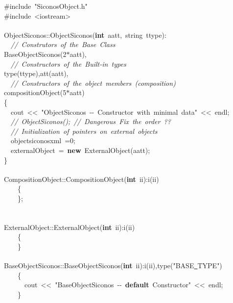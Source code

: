 {\ttfamily \raggedright \small
\#include\ "{}SiconosObject.h"{}\\
\#include\ <{}iostream>{}\\
\ \\
ObjectSiconos::ObjectSiconos(\textbf{int}\ aatt,\ string\ ttype):\\
\ \ \textsl{//\ Construtors\ of\ the\ Base\ Class}\\
BaseObjectSiconos(2$\ast$aatt),\\
\ \ \textsl{//\ Constructors\ of\ the\ Built-{}in\ types}\\
type(ttype),att(aatt),\\
\ \ \textsl{//\ Constructors\ of\ the\ object\ members\ (composition)}\\
compositionObject(5$\ast$aatt)\\
\{\\
\ \ cout\ <{}<{}\ "{}ObjectSiconos\ -{}-{}\ Constructor\ with\ minimal\ data"{}\ <{}<{}\ endl;\\
\ \ \textsl{//\ ObjectSiconos();\ //\ Dangerous\ Fix\ the\ order\ ??}\\
\ \ \textsl{//\ Initialization\ of\ pointers\ on\ external\ objects}\\
\ \ objectsiconosxml\ =0;\\
\ \ externalObject\ =\ \textbf{new}\ ExternalObject(aatt);\\
\}\\
\ \\
CompositionObject::CompositionObject(\textbf{int}\ ii):i(ii)\\
\ \ \ \ \{\\
\ \ \ \ \};\\
\ \\
\ \\
ExternalObject::ExternalObject(\textbf{int}\ ii):i(ii)\\
\ \ \ \ \{\\
\ \ \ \ \}\\
\ \\
BaseObjectSiconos::BaseObjectSiconos(\textbf{int}\ ii):i(ii),type("{}BASE\underline\ TYPE"{})\\
\ \ \ \ \{\ \\
\ \ \ \ \ \ cout\ <{}<{}\ "{}BaseObjectSiconos\ -{}-{}\ \textbf{default}\ Constructor"{}\ <{}<{}\ endl;\\
\ \ \ \ \}\\
\ \\
 }
\normalfont\normalsize


